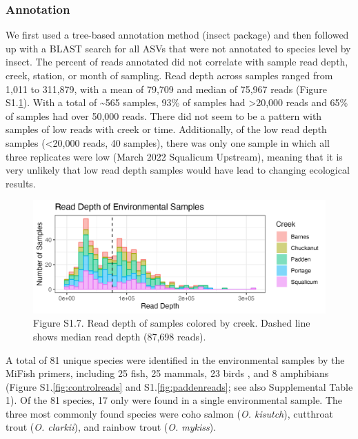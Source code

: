 \documentclass[
]{article}
\begin{document}
\hypertarget{annotation}{%
\subsubsection{Annotation}\label{annotation}}

We first used a tree-based annotation method (insect package) and then
followed up with a BLAST search for all ASVs that were not annotated to
species level by insect. The percent of reads annotated did not
correlate with sample read depth, creek, station, or month of sampling.
Read depth across samples ranged from 1,011 to 311,879, with a mean of
79,709 and median of 75,967 reads (Figure S1.\ref{fig:readdepth}). With
a total of \textasciitilde565 samples, 93\% of samples had
\textgreater20,000 reads and 65\% of samples had over 50,000 reads.
There did not seem to be a pattern with samples of low reads with creek
or time. Additionally, of the low read depth samples (\textless20,000
reads, 40 samples), there was only one sample in which all three
replicates were low (March 2022 Squalicum Upstream), meaning that it is
very unlikely that low read depth samples would have lead to changing
ecological results.

\begin{figure}
\centering
\includegraphics{../Output/SupplementalFigures/read_depths.png}
\caption{Figure S1.7. Read depth of samples colored by creek. Dashed
line shows median read depth (87,698 reads).\label{fig:readdepth}}
\end{figure}

A total of 81 unique species were identified in the environmental
samples by the MiFish primers, including 25 fish, 25 mammals, 23 birds ,
and 8 amphibians (Figure S1.\ref{fig:controlreads} and
S1.\ref{fig:paddenreads}; see also Supplemental Table 1). Of the 81
species, 17 only were found in a single environmental sample. The three
most commonly found species were coho salmon (\emph{O. kisutch}),
cutthroat trout (\emph{O. clarkii}), and rainbow trout (\emph{O.
mykiss}).
\end{document}
